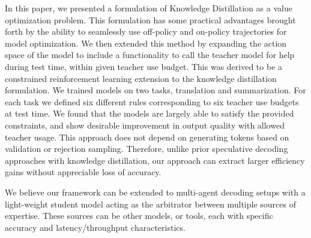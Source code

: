In this paper, we presented a formulation of Knowledge Distillation as a value optimization problem. This formulation has some practical advantages brought forth by the ability to seamlessly use off-policy and on-policy trajectories for model optimization. We then extended this method by expanding the action space of the model to include a functionality to call the teacher model for help during test time, within given teacher use budget. This was derived to be a constrained reinforcement learning extension to the knowledge distillation formulation. We trained models on two tasks, translation and summarization. For each task we defined six different rules corresponding to six teacher use budgets at test time.  We found that the models are largely able to satisfy the provided constraints, and show desirable improvement in output quality with allowed teacher usage. This approach does not depend on generating tokens based on validation or rejection sampling. Therefore, unlike prior speculative decoding approaches with knowledge distillation, our approach can extract larger efficiency gains without appreciable loss of accuracy.

We believe our framework can be extended to multi-agent decoding setups with a light-weight student model acting as the arbitrator between multiple sources of expertise. These sources can be other models, or tools, each with specific accuracy and latency/throughput characteristics.
